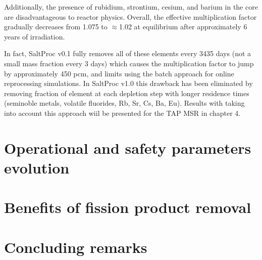 Additionally, the presence of rubidium, strontium, cesium, and barium in the 
core are disadvantageous to reactor physics. Overall, the effective 
multiplication factor gradually decreases from 1.075 to $\approx$1.02 at 
equilibrium after approximately 6 years of irradiation. 

In fact, SaltProc v0.1 fully removes all of these elements every 3435 days 
(not a small mass fraction every 3 days) which causes the multiplication 
factor to jump by approximately 450 pcm, and limits using the batch approach 
for online reprocessing simulations. In SaltProc v1.0 this drawback has been  
eliminated by removing fraction of element at each depletion step with longer 
residence times (seminoble metals, volatile fluorides, Rb, Sr, Cs, Ba, Eu).  
Results with taking into account this approach wiil be presented for the 
\gls{TAP} \gls{MSR} in chapter 4.

\section{Operational and safety parameters evolution}

\section{Benefits of fission product removal}

\section{Concluding remarks}